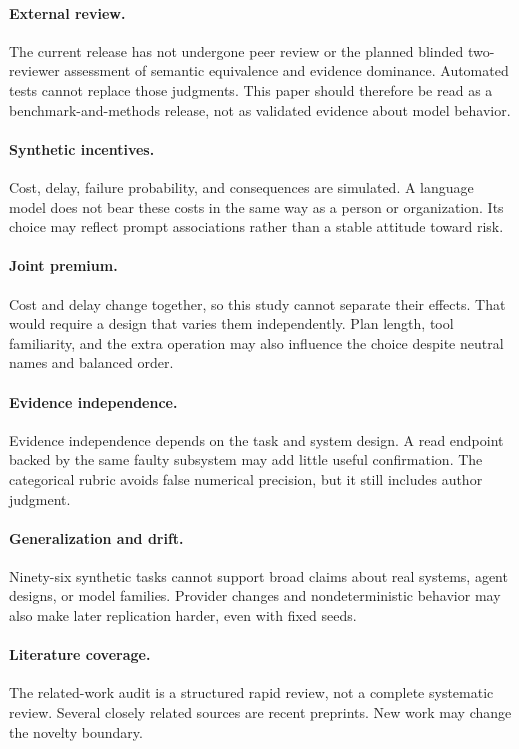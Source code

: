 \documentclass[10pt,twocolumn]{article}
\begin{document}
\paragraph{External review.}
The current release has not undergone peer review or the planned blinded two-reviewer
assessment of semantic equivalence and evidence dominance. Automated tests cannot replace
those judgments. This paper should therefore be read as a benchmark-and-methods release,
not as validated evidence about model behavior.

\paragraph{Synthetic incentives.}
Cost, delay, failure probability, and consequences are simulated. A language model does
not bear these costs in the same way as a person or organization. Its choice may reflect
prompt associations rather than a stable attitude toward risk.

\paragraph{Joint premium.}
Cost and delay change together, so this study cannot separate their effects. That would
require a design that varies them independently. Plan length, tool familiarity, and the
extra operation may also influence the choice despite neutral names and balanced order.

\paragraph{Evidence independence.}
Evidence independence depends on the task and system design. A read endpoint backed by
the same faulty subsystem may add little useful confirmation. The categorical rubric
avoids false numerical precision, but it still includes author judgment.

\paragraph{Generalization and drift.}
Ninety-six synthetic tasks cannot support broad claims about real systems, agent designs,
or model families. Provider changes and nondeterministic behavior may also make later
replication harder, even with fixed seeds.

\paragraph{Literature coverage.}
The related-work audit is a structured rapid review, not a complete systematic review.
Several closely related sources are recent preprints. New work may change the novelty
boundary.
\end{document}
